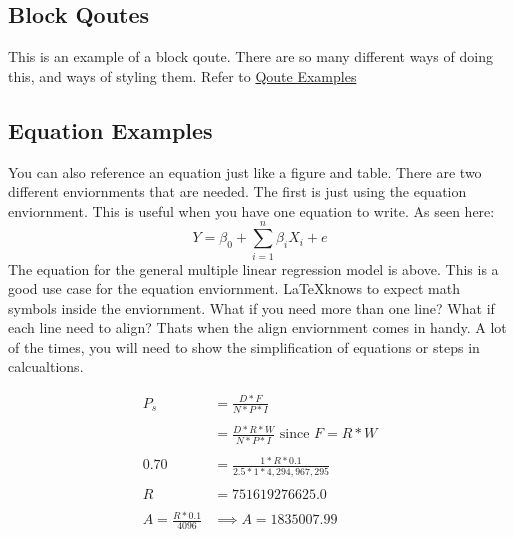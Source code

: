 \documentclass[./dissertation.tex]{subfiles}
\begin{document}
      \subsection{Block Qoutes}
        \begin{displayquote}
          This is an example of a block qoute. There are so many different ways of doing this, and ways of styling them. Refer to \href{https://www.overleaf.com/learn/latex/Typesetting_quotations}{Qoute Examples}
        \end{displayquote}

      \subsection{Equation Examples}
        You can also reference an equation just like a figure and table. There are two different enviornments that are needed. The first is just using the equation enviornment. This is useful when you have one equation to write. As seen here:
          \begin{equation*}
            Y=\beta_{0} + \sum\limits_{i=1}^n \beta_{i}X_{i} + e
          \end{equation*}
        The equation for the general multiple linear regression model is above. This is a good use case for the equation enviornment. \LaTeX knows to expect math symbols inside the enviornment. What if you need more than one line? What if each line need to align? Thats when the align enviornment comes in handy. A lot of the times, you will need to show the simplification of equations or steps in calcualtions.
          \begin{center}
            \begin{align*}
              P_{s} &= \frac{D*F}{N*P*I}\\
                            \\
              &= \frac{D*R*W}{N*P*I} \text{  since } F=R*W\\
                      \\
              0.70 &= \frac{1*R*0.1}{2.5*1*4,294,967,295}\\
                      \\
             R &= 751619276625.0 \\
             \\
             A=\frac{R*0.1}{4096} &\implies A = 1835007.99
           \end{align*}
         \end{center}
\end{document}
